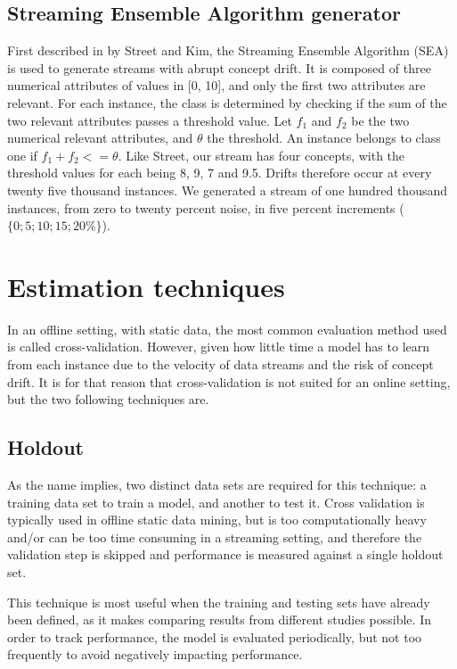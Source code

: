 \subsection{Streaming Ensemble Algorithm generator}
First described in \cite{street2001streaming} by Street and Kim, the Streaming Ensemble Algorithm (SEA) is used to generate streams with abrupt concept drift. It is composed of three numerical attributes of values in [0, 10], and only the first two attributes are relevant. For each instance, the class is determined by checking if the sum of the two relevant attributes passes a threshold value. Let $f_1$ and $f_2$ be the two numerical relevant attributes, and $\theta$ the threshold. An instance belongs to class one if $f_1 + f_2 <= \theta$. Like Street, our stream has four concepts, with the threshold values for each being 8, 9, 7 and 9.5. Drifts therefore occur at every twenty five thousand instances. We generated a stream of one hundred thousand instances, from zero to twenty percent noise, in five percent increments ($\{0; 5; 10; 15; 20\%\}$).

\section{Estimation techniques}
In an offline setting, with static data, the most common evaluation method used is called cross-validation. However, given how little time a model has to learn from each instance due to the velocity of data streams and the risk of concept drift. It is for that reason that cross-validation is not suited for an online setting, but the two following techniques are.

\subsection{Holdout}
As the name implies, two distinct data sets are required for this technique: a training data set to train a model, and another to test it.  Cross validation is typically used in offline static data mining, but is too computationally heavy and/or can be too time consuming in a streaming setting, and therefore the validation step is skipped and performance is measured against a single holdout set.\cite{bifet2009data}
 
This technique is most useful when the training and testing sets have already been defined, as it makes comparing results from different studies possible.
In order to track performance, the model is evaluated periodically, but not too frequently to avoid negatively impacting performance.

